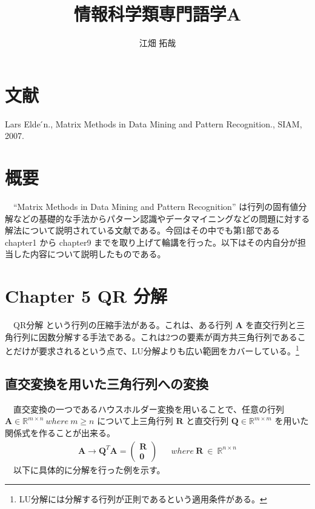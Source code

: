 \documentclass[a4paper,10pt]{jarticle}
\author{江畑 拓哉}
\date{}
\title{情報科学類専門語学A}
\begin{document}
\maketitle
\section{文献}
\label{sec:org8aaf515}
Lars Elde ́n., Matrix Methods in Data Mining and Pattern Recognition., SIAM, 2007.\\
\section{概要}
\label{sec:orgd18daa0}
　``Matrix Methods in Data Mining and Pattern Recognition'' は行列の固有値分解などの基礎的な手法からパターン認識やデータマイニングなどの問題に対する解法について説明されている文献である。今回はその中でも第1部である chapter1 から chapter9 までを取り上げて輪講を行った。以下はその内自分が担当した内容について説明したものである。\\
\section{Chapter 5 QR 分解}
\label{sec:org244e2db}
　QR分解 という行列の圧縮手法がある。これは、ある行列 \(\bm{A}\) を直交行列と三角行列に因数分解する手法である。これは2つの要素が両方共三角行列であることだけが要求されるという点で、LU分解よりも広い範囲をカバーしている。\footnote{LU分解には分解する行列が正則であるという適用条件がある。}\\
\subsection{直交変換を用いた三角行列への変換}
\label{sec:orgdefcfb8}
　直交変換の一つであるハウスホルダー変換を用いることで、任意の行列 \(\bm{A} \in \mathbb{R}^{m\times n}\ where\ m\geq n\) について上三角行列 \(\bm{R}\) と直交行列 \(\bm{Q} \in \mathbb{R}^{m \times m}\) を用いた関係式を作ることが出来る。\\
\begin{align*}
\bm{A}\rightarrow \bm{Q}^T \bm{A} = 
\begin{pmatrix}\bm{R} \\ \bm{0}\end{pmatrix}
&& where\ \bm{R}\ \in\ \mathbb{R}^{n\times n}
\end{align*}
　以下に具体的に分解を行った例を示す。\\
\end{document}
